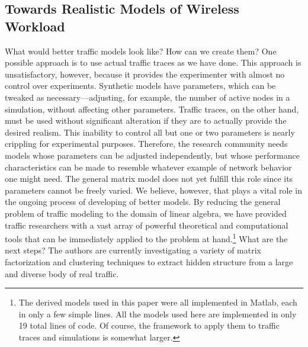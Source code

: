 \documentclass[twocolumn,final]{svjour3}
\newcommand{\caps}[1]{{\smaller{#1}}}
\begin{document}

\subsection{Towards Realistic Models of Wireless Workload}

What would better traffic models look like? How can we create them? One possible approach is to use actual traffic traces as we have done. This approach is unsatisfactory, however, because it provides the experimenter with almost no control over experiments. Synthetic models have parameters, which can be tweaked as necessary---adjusting, for example, the number of active nodes in a simulation, without affecting other parameters. Traffic traces, on the other hand, must be used without significant alteration if they are to actually provide the desired realism. This inability to control all but one or two parameters is nearly crippling for experimental purposes. Therefore, the research community needs models whose parameters can be adjusted independently, but whose performance characteristics can be made to resemble whatever example of network behavior one might need. The general matrix model does not yet fulfill this role since its parameters cannot be freely varied. We believe, however, that \caps{GMM} plays a vital role in the ongoing process of developing  of better models. By reducing the general problem of traffic modeling to the domain of linear algebra, we have provided traffic researchers with a vast array of powerful theoretical and computational tools that can be immediately applied to the problem at hand.\footnote{The derived models used in this paper were all implemented in Matlab, each in only a few simple lines. All the models used here are implemented in only 19 total lines of code. Of course, the framework to apply them to traffic traces and simulations is somewhat larger.} What are the next steps? The authors are currently investigating a variety of matrix factorization and clustering techniques to extract hidden structure from a large and diverse body of real traffic.
\end{document}
